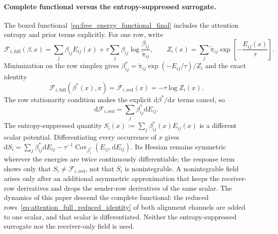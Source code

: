 \paragraph{Complete functional versus the entropy-suppressed surrogate.}
The boxed functional~\eqref{eq:free_energy_functional_final} includes the attention entropy and prior terms explicitly. For one row, write
\begin{equation}
\mathcal{F}_{i,\mathrm{full}}(\beta,x)=\sum_j\beta_{ij}E_{ij}(x)+\tau\sum_j\beta_{ij}\log\frac{\beta_{ij}}{\tilde\pi_{ij}},
\qquad
Z_i(x)=\sum_j\tilde\pi_{ij}\exp\left[-\frac{E_{ij}(x)}{\tau}\right].
\label{eq:attention_full_reduced_identity}
\end{equation}
Minimization on the row simplex gives $\beta_{ij}^*=\tilde\pi_{ij}\exp(-E_{ij}/\tau)/Z_i$ and the exact identity
\begin{equation}
\mathcal{F}_{i,\mathrm{full}}(\beta^*(x),x)=\mathcal{F}_{i,\mathrm{red}}(x)=-\tau\log Z_i(x).
\label{eq:attention_full_equals_reduced}
\end{equation}
The row stationarity condition makes the explicit $\mathrm{d}\beta^*/\mathrm{d}x$ terms cancel, so
\begin{equation}
\mathrm{d}\mathcal{F}_{i,\mathrm{red}}=\sum_j\beta_{ij}^*\mathrm{d}E_{ij}.
\label{eq:attention_envelope_differential}
\end{equation}
The entropy-suppressed quantity $S_i(x):=\sum_j\beta_{ij}^*(x)E_{ij}(x)$ is a different scalar potential. Differentiating every occurrence of $x$ gives $\mathrm{d}S_i=\sum_j\beta_{ij}^*\mathrm{d}E_{ij}-\tau^{-1}\operatorname{Cov}_{\beta_i^*}(E_{ij},\mathrm{d}E_{ij})$. Its Hessian remains symmetric wherever the energies are twice continuously differentiable; the response term shows only that $S_i\neq\mathcal{F}_{i,\mathrm{red}}$, not that $S_i$ is nonintegrable. A nonintegrable field arises only after an additional asymmetric approximation that keeps the receiver-row derivatives and drops the sender-row derivatives of the same scalar. The dynamics of this paper descend the complete functional: the reduced rows~\eqref{eq:attention_full_reduced_identity} of both alignment channels are added to one scalar, and that scalar is differentiated. Neither the entropy-suppressed surrogate nor the receiver-only field is used.

